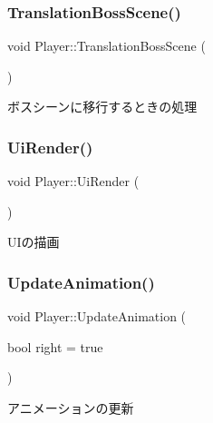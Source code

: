 \subsubsection{\texorpdfstring{Translation\+Boss\+Scene()}{TranslationBossScene()}}
{\footnotesize\ttfamily void Player\+::\+Translation\+Boss\+Scene (\begin{DoxyParamCaption}{ }\end{DoxyParamCaption})\hspace{0.3cm}{\ttfamily [inline]}}



ボスシーンに移行するときの処理 

\mbox{\label{class_player_a848c2ecb62431010eaa9298b2c2c4be0}} 
\subsubsection{\texorpdfstring{Ui\+Render()}{UiRender()}}
{\footnotesize\ttfamily void Player\+::\+Ui\+Render (\begin{DoxyParamCaption}{ }\end{DoxyParamCaption})}



U\+Iの描画 

\mbox{\label{class_player_abbb6662f1dc4ba3f75cafa6100160da0}} 
\subsubsection{\texorpdfstring{Update\+Animation()}{UpdateAnimation()}}
{\footnotesize\ttfamily void Player\+::\+Update\+Animation (\begin{DoxyParamCaption}\item[{bool}]{right = {\ttfamily true} }\end{DoxyParamCaption})\hspace{0.3cm}{\ttfamily [inline]}}



アニメーションの更新 

\mbox{\label{class_player_ab8accc9b83b030f5313f1b4872a7e634}} 
